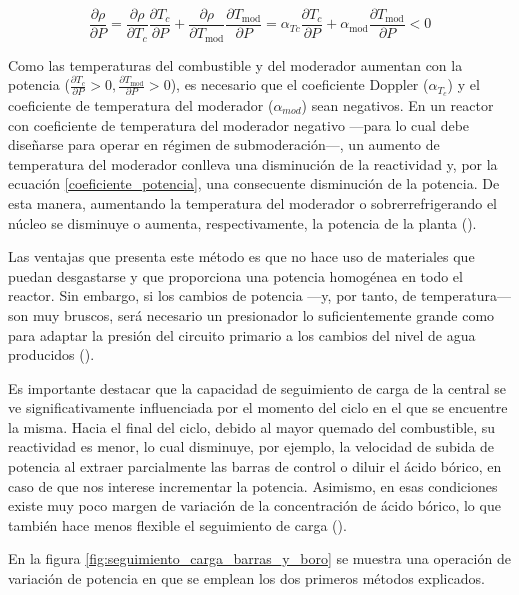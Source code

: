 \begin{itemize}
  \begin{equation} \label{coeficiente_potencia}
    \frac{\partial \rho}{\partial P}=\frac{\partial \rho}{\partial T_c} \frac{\partial T_c}{\partial P}+\frac{\partial \rho}{\partial T_{\mathrm{mod}}} \frac{\partial T_{\mathrm{mod}}}{\partial P}=\alpha_{T c} \frac{\partial T_c}{\partial P}+\alpha_{\mathrm{mod}} \frac{\partial T_{\mathrm{mod}}}{\partial P}<0
  \end{equation}

  Como las temperaturas del combustible y del moderador aumentan con la potencia ($\frac{\partial T_c}{\partial P}>0, \frac{\partial T_{\mathrm{mod}}}{\partial P}>0$), es necesario que el coeficiente Doppler ($\alpha_{T_{c}}$) y el coeficiente de temperatura del moderador ($\alpha_{mod}$) sean negativos. En un reactor con coeficiente de temperatura del moderador negativo ---para lo cual debe diseñarse para operar en régimen de submoderación---, un aumento de temperatura del moderador conlleva una disminución de la \gls{reactividad} y, por la ecuación \ref{coeficiente_potencia}, una consecuente disminución de la potencia. De esta manera, aumentando la temperatura del moderador o sobrerrefrigerando el núcleo se disminuye o aumenta, respectivamente, la potencia de la planta (\cite{apuntes_centrales}).
  
  Las ventajas que presenta este método es que no hace uso de materiales que puedan desgastarse y que proporciona una potencia homogénea en todo el reactor. Sin embargo, si los cambios de potencia ---y, por tanto, de temperatura--- son muy bruscos, será necesario un presionador lo suficientemente grande como para adaptar la presión del circuito primario a los cambios del nivel de agua producidos (\cite{seguimiento_carga_josep_rey}).
\end{itemize}

Es importante destacar que la capacidad de seguimiento de carga de la central se ve significativamente influenciada por el momento del ciclo en el que se encuentre la misma. Hacia el final del ciclo, debido al mayor quemado del combustible, su reactividad es menor, lo cual disminuye, por ejemplo, la velocidad de subida de potencia al extraer parcialmente las barras de control o diluir el ácido bórico, en caso de que nos interese incrementar la potencia. Asimismo, en esas condiciones existe muy poco margen de variación de la concentración de ácido bórico, lo que también hace menos flexible el seguimiento de carga (\cite{apuntes_centrales}).

En la figura \ref{fig:seguimiento_carga_barras_y_boro} se muestra una operación de variación de potencia en que se emplean los dos primeros métodos explicados.

